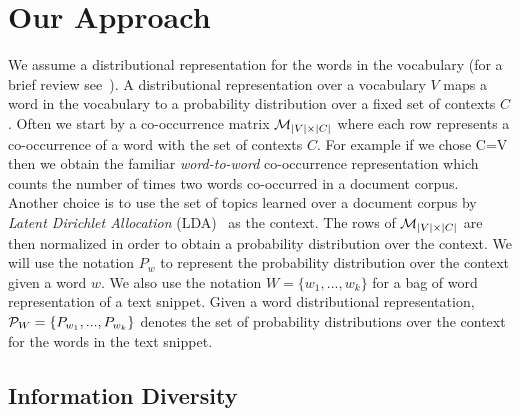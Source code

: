 \documentclass{article} %
\begin{document}

\section{Our Approach}
\label{sec:our-approach}


We assume a distributional representation for the words in the vocabulary (for a brief review
see~\cite{Turian10wordrepresentations}). A distributional representation over a vocabulary $V$ maps a word in the vocabulary to a 
probability distribution over a fixed set of contexts $C$. Often we start by a co-occurrence matrix ${\mathcal M}_{|V|\times|C|}$ where each row represents a co-occurrence of a word with the set of contexts
$C$. For example if we chose C=V then we obtain the familiar {\sl word-to-word} co-occurrence representation which counts the number
of times two words co-occurred in a document corpus. Another choice is to use the set of topics learned over a document
corpus by {\sl Latent Dirichlet Allocation} (LDA)~\cite{Blei:2003:LDA:944919.944937} as the context. The rows of ${\mathcal M}_{|V|\times|C|}$
are then normalized in order to obtain a probability distribution over the context. We will use the notation $P_w$ to represent
the probability distribution over the context  given a word $w$. We also use the notation $W=\{w_1,...,w_k\}$ for a bag of word representation of a text snippet. Given a word distributional representation, ${\mathcal P}_{W}=\{P_{w_1},...,P_{w_k}\}$ denotes the set of probability distributions over the context for the words
in the text snippet.


\subsection{Information Diversity}
\label{sec:information-diversity}
\end{document}
